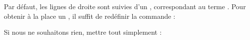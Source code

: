 Par défaut, les lignes de droite sont suivies d'un , correspondant au terme . Pour obtenir à la place un , il suffit de redéfinir la commande  :

\begin{latexcode}
\renewcommand{\Rlineflag}{D}
\end{latexcode}

Si nous ne souhaitons  rien, mettre tout simplement :


\begin{latexcode}
\renewcommand{\Rlineflag}{D}
\end{latexcode}





